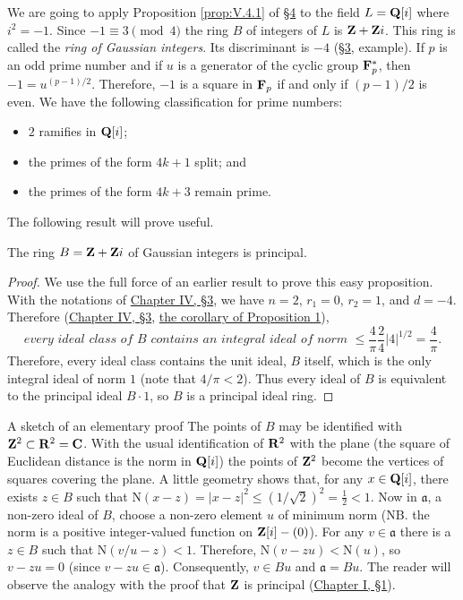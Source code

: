 
We are going to apply Proposition \ref{prop:V.4.1} of \hyperref[sec:5.4]{§4} to the field
$L=\mathbf{Q}[i]$ where $i^{2}=-1$. Since $-1\equiv3\pmod4$ the ring $B$ of
integers of $L$ is $\mathbf{Z}+\mathbf{Z} i$. This ring is called the \emph{ring of
Gaussian integers}. Its discriminant is $-4$ (\hyperref[sec:5.3]{§3}, example). If $p$ is an
odd prime number and if $u$ is a generator of the cyclic group $\mathbf{F}_{p}^{*}$,
then $-1=u^{(p-1)/2}$. Therefore, $-1$ is a square in $\mathbf{F}_{p}$ if and only
if $(p-1)/2$ is even. We have the following classification for prime
numbers:
\begin{itemize}
\item $2$ ramifies in $\mathbf{Q}[i]$;
\item the primes of the form $4k+1$ split; and
\item the primes of the form $4k+3$ remain prime.
\end{itemize}

The following result will prove useful.

\begin{proposition}
\label{prop:V.6.1}
The ring $B=\mathbf{Z}+\mathbf{Z} i$ of Gaussian integers is principal.
\end{proposition}

\begin{proof}
We use the full force of an earlier result to prove this easy proposition.
With the notations of \hyperref[sec:4.3]{Chapter IV, §3}, we have $n=2$, $r_{1}=0$, $r_{2}=1$,
and $d=-4$. Therefore (\hyperref[sec:4.3]{Chapter IV, §3}, \hyperref[cor:IV.3.1]{the corollary of Proposition 1}),
\[
\textit{every ideal class of } B \textit{ contains an integral ideal of norm }
\leq\frac{4}{\pi}\frac{2}{4}|4|^{1/2}=\frac{4}{\pi}.
\]
Therefore, every ideal class contains the unit ideal, $B$ itself, which is
the only integral ideal of norm $1$ (note that $4/\pi<2$). Thus every ideal
of $B$ is equivalent to the principal ideal $B\cdot1$, so $B$ is a principal
ideal ring.
\end{proof}

\begin{statement}{A sketch of an elementary proof}
The points of $B$ may be identified with $\mathbf{Z}^{2}\subset\mathbf{R}^{2}=\mathbf{C}$. With the
usual identification of $\mathbf{R}^{2}$ with the plane (the square of Euclidean
distance is the norm in $\mathbf{Q}[i]$) the points of $\mathbf{Z}^{2}$ become the vertices
of squares covering the plane. A little geometry shows that, for any
$x\in\mathbf{Q}[i]$, there exists $z\in B$ such that
$\mathrm{N}(x-z)=|x-z|^{2}\leq(1/\sqrt{2})^{2}=\frac{1}{2}<1$. Now in
$\mathfrak{a}$, a non-zero ideal of $B$, choose a non-zero element $u$ of
minimum norm (NB. the norm is a positive integer-valued function on
$\mathbf{Z}[i]-(0)$). For any $v\in\mathfrak{a}$ there is a $z\in B$ such that
$\mathrm{N}(v/u-z)<1$. Therefore, $\mathrm{N}(v-zu)<\mathrm{N}(u)$, so
$v-zu=0$ (since $v-zu\in\mathfrak{a}$). Consequently,
$v\in Bu$ and $\mathfrak{a}=Bu$. The reader will observe the analogy with
the proof that $\mathbf{Z}$ is principal (\hyperref[sec:1.1]{Chapter I, §1}).
\end{statement}

